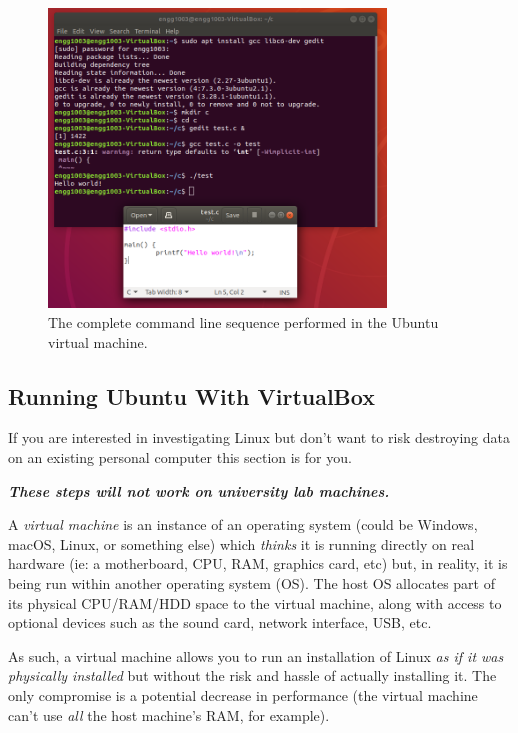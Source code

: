 \documentclass{lab}
\begin{document}
\begin{figure}[H]
\begin{center}
\includegraphics[width=0.8\textwidth]{c_ubuntu.png}
\end{center}
\caption{The complete command line sequence performed in the Ubuntu virtual machine.}\label{fig:c_ubuntu}
\end{figure}

\pagebreak
\subsection{Running Ubuntu With VirtualBox}\label{sec:virtualbox}

If you are interested in investigating Linux but don't want to risk destroying data on an existing personal computer this section is for you.

\textbf{\textit{These steps will not work on university lab machines.}}

A \textit{virtual machine} is an instance of an operating system (could be Windows, macOS, Linux, or something else) which \textit{thinks} it is running directly on real hardware (ie: a motherboard, CPU, RAM, graphics card, etc) but, in reality, it is being run within another operating system (OS). The host OS allocates part of its physical CPU/RAM/HDD space to the virtual machine, along with access to optional devices such as the sound card, network interface, USB, etc.

As such, a virtual machine allows you to run an installation of Linux \textit{as if it was physically installed} but without the risk and hassle of actually installing it. The only compromise is a potential decrease in performance (the virtual machine can't use \textit{all} the host machine's RAM, for example).
\end{document}
